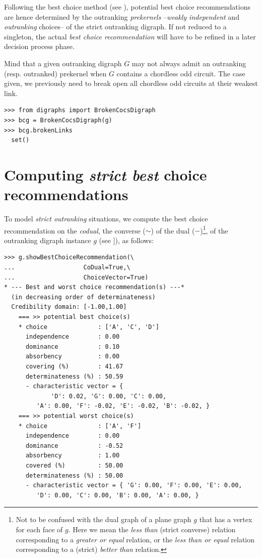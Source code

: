 Following the \Rubis best choice method (see \citet{BIS-2008a}), potential best choice recommendations are hence determined by the outranking \emph{prekernels} --\emph{weakly independent} and \emph{outranking} choices-- of the strict outranking digraph. If not reduced to a singleton, the actual \emph{best choice recommendation} will have to be refined in a later decision process phase.

Mind that a given outranking digraph $G$ may not always admit an outranking (resp. outranked) prekernel when $G$ contains a chordless odd circuit. The case given, we previously need to break open all chordless odd circuits at their weakest link.
\begin{lstlisting}
>>> from digraphs import BrokenCocsDigraph
>>> bcg = BrokenCocsDigraph(g)
>>> bcg.brokenLinks
  set()
\end{lstlisting}


\section{Computing \emph{strict best} choice recommendations}
\label{sec:6.4}

  
To model \emph{strict outranking} situations, we compute the best choice recommendation on the \emph{codual}, the converse ($\sim$) of the dual ($-$)\footnote{Not to be confused with the dual graph of a plane graph $g$ that has a vertex for each face of $g$. Here we mean the \emph{less than} (strict converse) relation corresponding to a \emph{greater or equal} relation, or the \emph{less than or equal} relation corresponding to a (strict) \emph{better than} relation.}, of the outranking digraph instance $g$ (see \citet{BIS-2013}]), as follows:
\begin{lstlisting}[caption={Computing the best choice recommendation},label=list:6.6]
>>> g.showBestChoiceRecommendation(\
...                   CoDual=True,\
...                   ChoiceVector=True)   
* --- Best and worst choice recommendation(s) ---*
  (in decreasing order of determinateness)   
  Credibility domain: [-1.00,1.00]
    === >> potential best choice(s)
    * choice              : ['A', 'C', 'D']
      independence        : 0.00
      dominance           : 0.10
      absorbency          : 0.00
      covering (%)        : 41.67
      determinateness (%) : 50.59
      - characteristic vector = {
             'D': 0.02, 'G': 0.00, 'C': 0.00,
	     'A': 0.00, 'F': -0.02, 'E': -0.02, 'B': -0.02, }
    === >> potential worst choice(s) 
    * choice              : ['A', 'F']
      independence        : 0.00
      dominance           : -0.52
      absorbency          : 1.00
      covered (%)         : 50.00
      determinateness (%) : 50.00
      - characteristic vector = { 'G': 0.00, 'F': 0.00, 'E': 0.00,
	     'D': 0.00, 'C': 0.00, 'B': 0.00, 'A': 0.00, }
\end{lstlisting}				  

